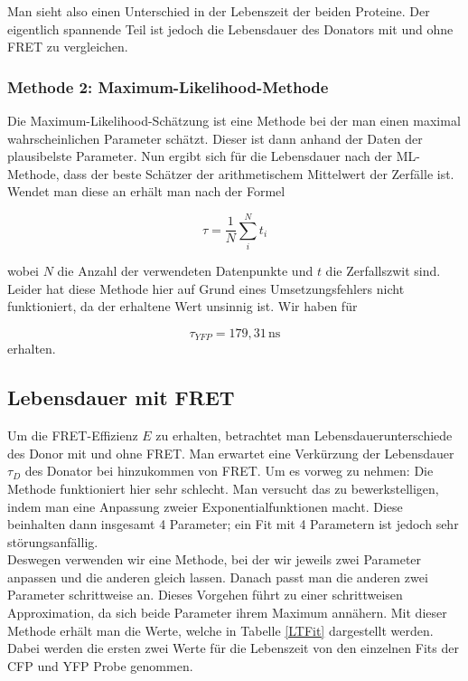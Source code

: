 Man sieht also einen Unterschied in der Lebenszeit der beiden Proteine. Der eigentlich spannende Teil 
ist jedoch die Lebensdauer des Donators mit und ohne FRET zu vergleichen.

\subsubsection{Methode 2: Maximum-Likelihood-Methode}

Die Maximum-Likelihood-Schätzung \cite[S.176]{Stahel2000} ist eine Methode bei der man einen maximal wahrscheinlichen Parameter schätzt.
Dieser ist dann anhand der Daten der plausibelste Parameter. Nun ergibt sich für die Lebensdauer nach der
ML-Methode, dass der beste Schätzer der arithmetischem Mittelwert der Zerfälle ist.
Wendet man diese an erhält man nach der Formel

\begin{equation}
    \tau = \frac{1}{N} \sum_i^N t_i
\end{equation}

wobei $N$ die Anzahl der verwendeten Datenpunkte und $t$ die Zerfallszwit sind. Leider hat diese Methode hier auf Grund 
eines Umsetzungsfehlers nicht funktioniert, da der erhaltene Wert unsinnig ist. Wir haben für 

\begin{equation*}
    \tau_{YFP} = 179,31\,\mathrm{ns}
\end{equation*}
erhalten. 



\subsection{Lebensdauer mit FRET}

Um die FRET-Effizienz $E$ zu erhalten, betrachtet man Lebensdauerunterschiede des Donor mit und ohne FRET. 
Man erwartet eine Verkürzung der Lebensdauer $\tau_D$ des Donator bei hinzukommen von FRET. Um es vorweg zu nehmen: Die Methode funktioniert hier sehr schlecht. 
Man versucht das zu bewerkstelligen, indem man eine Anpassung zweier Exponentialfunktionen macht. Diese beinhalten dann insgesamt 4 Parameter; 
ein Fit mit 4 Parametern ist jedoch sehr störungsanfällig.\\

Deswegen verwenden wir eine Methode, bei der wir jeweils zwei Parameter anpassen und die anderen gleich lassen. Danach passt man die anderen zwei 
Parameter schrittweise an. Dieses Vorgehen führt zu einer schrittweisen Approximation, da sich beide Parameter ihrem Maximum annähern. Mit dieser 
Methode erhält man die Werte, welche in Tabelle \ref{LTFit} dargestellt werden. Dabei werden die ersten zwei Werte für die Lebenszeit von den einzelnen Fits der CFP und YFP Probe genommen.\\

